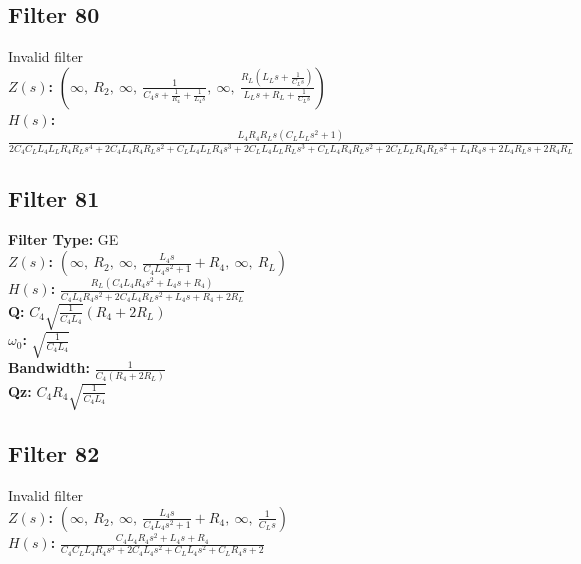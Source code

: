 \documentclass{article}
\begin{document}
\subsection*{Filter 80}
Invalid filter \\ 
\textbf{$Z(s)$:} $\left( \infty, \  R_{2}, \  \infty, \  \frac{1}{C_{4} s + \frac{1}{R_{4}} + \frac{1}{L_{4} s}}, \  \infty, \  \frac{R_{L} \left(L_{L} s + \frac{1}{C_{L} s}\right)}{L_{L} s + R_{L} + \frac{1}{C_{L} s}}\right)$ \\ 
\textbf{$H(s)$:} $\frac{L_{4} R_{4} R_{L} s \left(C_{L} L_{L} s^{2} + 1\right)}{2 C_{4} C_{L} L_{4} L_{L} R_{4} R_{L} s^{4} + 2 C_{4} L_{4} R_{4} R_{L} s^{2} + C_{L} L_{4} L_{L} R_{4} s^{3} + 2 C_{L} L_{4} L_{L} R_{L} s^{3} + C_{L} L_{4} R_{4} R_{L} s^{2} + 2 C_{L} L_{L} R_{4} R_{L} s^{2} + L_{4} R_{4} s + 2 L_{4} R_{L} s + 2 R_{4} R_{L}}$ \\ 
\subsection*{Filter 81}
\textbf{Filter Type:} GE \\ 
\textbf{$Z(s)$:} $\left( \infty, \  R_{2}, \  \infty, \  \frac{L_{4} s}{C_{4} L_{4} s^{2} + 1} + R_{4}, \  \infty, \  R_{L}\right)$ \\ 
\textbf{$H(s)$:} $\frac{R_{L} \left(C_{4} L_{4} R_{4} s^{2} + L_{4} s + R_{4}\right)}{C_{4} L_{4} R_{4} s^{2} + 2 C_{4} L_{4} R_{L} s^{2} + L_{4} s + R_{4} + 2 R_{L}}$ \\ 
\textbf{Q:} $C_{4} \sqrt{\frac{1}{C_{4} L_{4}}} \left(R_{4} + 2 R_{L}\right)$ \\ 
\textbf{$\omega_0$:} $\sqrt{\frac{1}{C_{4} L_{4}}}$ \\ 
\textbf{Bandwidth:} $\frac{1}{C_{4} \left(R_{4} + 2 R_{L}\right)}$ \\ 
\textbf{Qz:} $C_{4} R_{4} \sqrt{\frac{1}{C_{4} L_{4}}}$ \\ 
\subsection*{Filter 82}
Invalid filter \\ 
\textbf{$Z(s)$:} $\left( \infty, \  R_{2}, \  \infty, \  \frac{L_{4} s}{C_{4} L_{4} s^{2} + 1} + R_{4}, \  \infty, \  \frac{1}{C_{L} s}\right)$ \\ 
\textbf{$H(s)$:} $\frac{C_{4} L_{4} R_{4} s^{2} + L_{4} s + R_{4}}{C_{4} C_{L} L_{4} R_{4} s^{3} + 2 C_{4} L_{4} s^{2} + C_{L} L_{4} s^{2} + C_{L} R_{4} s + 2}$ \\ 
\end{document}
